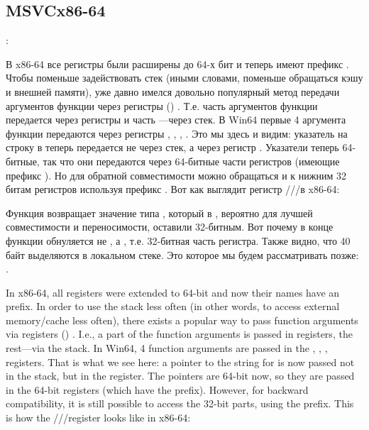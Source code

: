 \subsection{MSVC\EMDASH{}x86-64}

:




\ifdefined\RUSSIAN
В x86-64 все регистры были расширены до 64-х бит и теперь имеют префикс .
Чтобы поменьше задействовать стек (иными словами, поменьше обращаться кэшу и внешней памяти), уже давно имелся
довольно популярный метод передачи аргументов функции через регистры ()
\ifx\LITE\undefined {} \fi
.
Т.е. часть аргументов функции передается через регистры и часть ---через стек.
В Win64 первые 4 аргумента функции передаются через регистры \RCX, \RDX, , .
Это мы здесь и видим: указатель на строку в \printf теперь передается не через стек, а через регистр \RCX.
Указатели теперь 64-битные, так что они передаются через 64-битные части регистров (имеющие префикс ).
Но для обратной совместимости можно обращаться и к нижним 32 битам регистров используя префикс .
Вот как выглядит регистр \RAX/\EAX/\AX/\AL в x86-64:


Функция \main возвращает значение типа \Tint, который в \CCpp, вероятно для лучшей совместимости и переносимости,
оставили 32-битным. Вот почему в конце функции \main обнуляется не \RAX, а \EAX, т.е. 32-битная часть регистра.
Также видно, что 40 байт выделяются в локальном стеке.
Это  которое мы будем рассматривать позже: .
\fi %

\ifdefined\ENGLISH
In x86-64, all registers were extended to 64-bit and now their names have an  prefix.
In order to use the stack less often (in other words, to access external memory/cache less often), there exists
a popular way to pass function arguments via registers ()
\ifx\LITE\undefined {} \fi
.
I.e., a part of the function arguments is passed in registers, the rest---via the stack.
In Win64, 4 function arguments are passed in the \RCX, \RDX, ,  registers.
That is what we see here: a pointer to the string for \printf is now passed not in the stack, but in the \RCX register.
The pointers are 64-bit now, so they are passed in the 64-bit registers (which have the  prefix).
However, for backward compatibility, it is still possible to access the 32-bit parts, using the  prefix.
This is how the \RAX/\EAX/\AX/\AL register looks like in x86-64:

